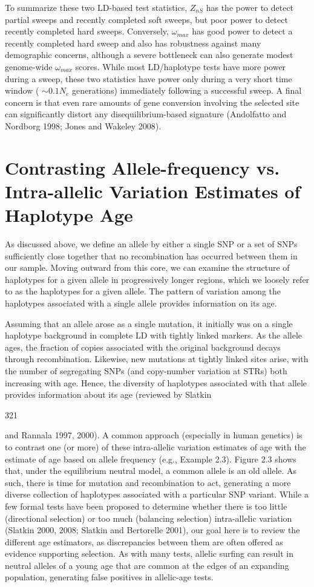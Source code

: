 \documentclass{article}
\begin{document}
To summarize these two LD-based test statistics,  $ Z_{nS} $ has the power to detect partial sweeps and recently completed soft sweeps, but poor power to detect recently completed hard sweeps. Conversely,  $ \omega_{max} $ has good power to detect a recently completed hard sweep and also has robustness against many demographic concerns, although a severe bottleneck can also generate modest genome-wide  $ \omega_{max} $ scores. While most LD/haplotype tests have more power during a sweep, these two statistics have power only during a very short time window ( $ \sim0.1N_{e} $ generations) immediately following a successful sweep. A final concern is that even rare amounts of gene conversion involving the selected site can significantly distort any disequilibrium-based signature (Andolfatto and Nordborg 1998; Jones and Wakeley 2008).

\section{Contrasting Allele-frequency vs. Intra-allelic Variation Estimates of Haplotype Age}
As discussed above, we define an allele by either a single SNP or a set of SNPs sufficiently close together that no recombination has occurred between them in our sample. Moving outward from this core, we can examine the structure of haplotypes for a given allele in progressively longer regions, which we loosely refer to as the haplotypes for a given allele. The pattern of variation among the haplotypes associated with a single allele provides information on its age.

Assuming that an allele arose as a single mutation, it initially was on a single haplotype background in complete LD with tightly linked markers. As the allele ages, the fraction of copies associated with the original background decays through recombination. Likewise, new mutations at tightly linked sites arise, with the number of segregating SNPs (and copy-number variation at STRs) both increasing with age. Hence, the diversity of haplotypes associated with that allele provides information about its age (reviewed by Slatkin

321

and Rannala 1997, 2000). A common approach (especially in human genetics) is to contrast one (or more) of these intra-allelic variation estimates of age with the estimate of age based on allele frequency (e.g., Example 2.3). Figure 2.3 shows that, under the equilibrium neutral model, a common allele is an old allele. As such, there is time for mutation and recombination to act, generating a more diverse collection of haplotypes associated with a particular SNP variant. While a few formal tests have been proposed to determine whether there is too little (directional selection) or too much (balancing selection) intra-allelic variation (Slatkin 2000, 2008; Slatkin and Bertorelle 2001), our goal here is to review the different age estimators, as discrepancies between them are often offered as evidence supporting selection. As with many tests, allelic surfing can result in neutral alleles of a young age that are common at the edges of an expanding population, generating false positives in allelic-age tests.
\end{document}

